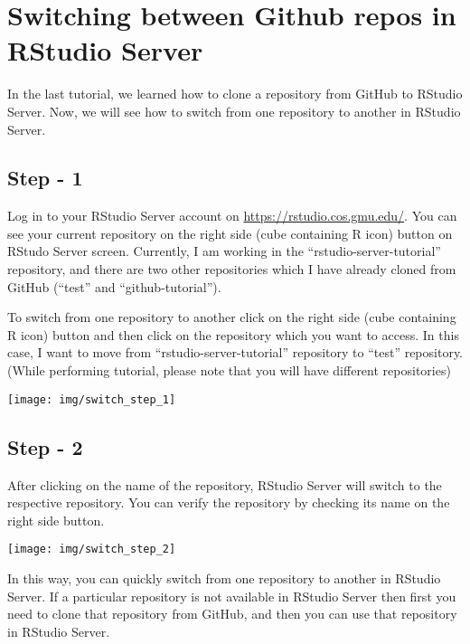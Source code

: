 \documentclass[
]{book}
\begin{document}
\hypertarget{switching-between-github-repos-in-rstudio-server}{%
\section{Switching between Github repos in RStudio Server}\label{switching-between-github-repos-in-rstudio-server}}

In the last tutorial, we learned how to clone a repository from GitHub to RStudio Server. Now, we will see how to switch from one repository to another in RStudio Server.

\hypertarget{step---1-2}{%
\subsection{Step - 1}\label{step---1-2}}

Log in to your RStudio Server account on \url{https://rstudio.cos.gmu.edu/}. You can see your current repository on the right side (cube containing R icon) button on RStudo Server screen. Currently, I am working in the ``rstudio-server-tutorial'' repository, and there are two other repositories which I have already cloned from GitHub (``test'' and ``github-tutorial'').

To switch from one repository to another click on the right side (cube containing R icon) button and then click on the repository which you want to access. In this case, I want to move from ``rstudio-server-tutorial'' repository to ``test'' repository. (While performing tutorial, please note that you will have different repositories)

\begin{center}\texttt{[image: img/switch\_step\_1]} \end{center}

\hypertarget{step---2-2}{%
\subsection{Step - 2}\label{step---2-2}}

After clicking on the name of the repository, RStudio Server will switch to the respective repository. You can verify the repository by checking its name on the right side button.

\begin{center}\texttt{[image: img/switch\_step\_2]} \end{center}

In this way, you can quickly switch from one repository to another in RStudio Server. If a particular repository is not available in RStudio Server then first you need to clone that repository from GitHub, and then you can use that repository in RStudio Server.
\end{document}
